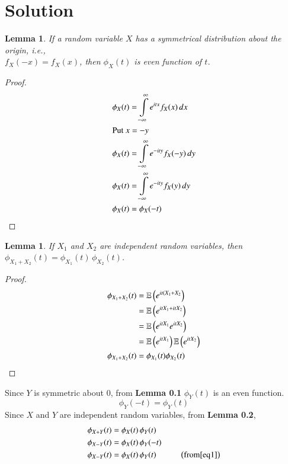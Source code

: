 \documentclass[journal,12pt,twocolumn]{IEEEtran}
\newtheorem{lemma}[theorem]{Lemma}
\begin{document}
\section*{Solution}
\begin{lemma}
If a random variable $X$ has a symmetrical distribution about the origin, i.e.,\\
$f_X(-x) = f_X(x)$, then $\phi_X(t)$ is even function of $t$.
\end{lemma}
\begin{proof}
\begin{align}
    \phi_X(t) &= \int \limits_{-\infty}^{\infty} e^{itx}f_X(x) \, dx \\
    \intertext{Put $x = -y$}
    \phi_X(t) &= \int \limits_{-\infty}^{\infty} e^{-ity}f_X(-y) \, dy \\
    \phi_X(t) &= \int \limits_{-\infty}^{\infty} e^{-ity}f_X(y) \, dy \\
    \phi_X(t) &= \phi_X(-t)
\end{align}
\end{proof}
\begin{lemma}
If $X_1$ and $X_2$ are independent random variables, then $\phi_{X_1 + X_2}(t) = \phi_{X_1}(t)\, \phi_{X_2}(t)$.
\end{lemma}
\begin{proof}
\begin{align}
    \phi_{X_1 + X_2}(t) &= \mathbb{E}\left(e^{it(X_1+X_2}\right)\\
    &= \mathbb{E}\left(e^{itX_1+itX_2}\right)\\
    &= \mathbb{E}\left(e^{itX_1}e^{itX_2}\right)\\
    &= \mathbb{E}\left(e^{itX_1}\right)\mathbb{E}\left(e^{itX_2}\right)\\
    \phi_{X_1 + X_2}(t) &= \phi_{X_1}(t)\phi_{X_2}(t)
\end{align}
\end{proof}
Since $Y$ is symmetric about $0$, from \textbf{Lemma 0.1} $\phi_Y(t)$ is an even function.
\begin{equation}
    \phi_Y(-t) = \phi_Y(t) \label{eq1}
\end{equation}
Since $X$ and $Y$ are independent random variables, from \textbf{Lemma 0.2},
\begin{align}
    \phi_{X+Y}(t) &= \phi_X(t)\, \phi_Y(t) \label{eq2}\\
    \phi_{X-Y}(t) &= \phi_X(t)\, \phi_Y(-t) \label{eq3}\\
    \phi_{X-Y}(t) &= \phi_X(t)\, \phi_Y(t) \hspace{1cm}\left(\text{from} \eqref{eq1}\right) \label{eq4}
\end{align}
\end{document}
